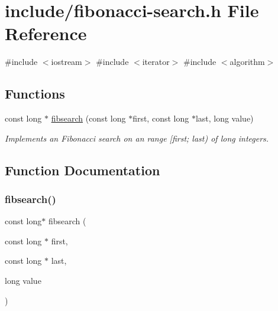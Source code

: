 \hypertarget{fibonacci-search_8h}{}\section{include/fibonacci-\/search.h File Reference}
\label{fibonacci-search_8h}
{\ttfamily \#include $<$iostream$>$}\newline
{\ttfamily \#include $<$iterator$>$}\newline
{\ttfamily \#include $<$algorithm$>$}\newline
\subsection*{Functions}
\begin{DoxyCompactItemize}
\item 
const long $\ast$ \mbox{\hyperlink{fibonacci-search_8h_aca1f23be8dba691c46dcacb5df55ccea}{fibsearch}} (const long $\ast$first, const long $\ast$last, long value)
\begin{DoxyCompactList}\small\item\em Implements an Fibonacci search on an range \mbox{[}first; last) of long integers. \end{DoxyCompactList}\end{DoxyCompactItemize}


\subsection{Function Documentation}
\mbox{\label{fibonacci-search_8h_aca1f23be8dba691c46dcacb5df55ccea}} 
\subsubsection{\texorpdfstring{fibsearch()}{fibsearch()}}
{\footnotesize\ttfamily const long$\ast$ fibsearch (\begin{DoxyParamCaption}\item[{const long $\ast$}]{first,  }\item[{const long $\ast$}]{last,  }\item[{long}]{value }\end{DoxyParamCaption})}



